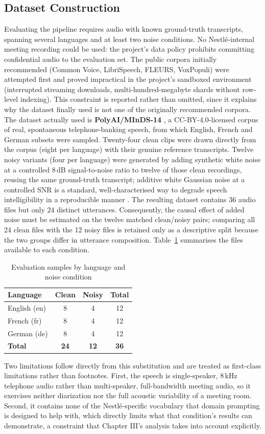 \documentclass[12pt]{report}
\begin{document}
\subsection{Dataset Construction}
Evaluating the pipeline requires audio with known ground-truth transcripts, spanning several languages and at least two noise conditions. No Nestl\'e-internal meeting recording could be used: the project's data policy prohibits committing confidential audio to the evaluation set. The public corpora initially recommended (Common Voice, LibriSpeech, FLEURS, VoxPopuli) were attempted first and proved impractical in the project's sandboxed environment (interrupted streaming downloads, multi-hundred-megabyte shards without row-level indexing). This constraint is reported rather than omitted, since it explains why the dataset finally used is not one of the originally recommended corpora.
The dataset actually used is \textbf{PolyAI/MInDS-14} \cite{gerz2021multilingual}, a CC-BY-4.0-licensed corpus of real, spontaneous telephone-banking speech, from which English, French and German subsets were sampled. Twenty-four clean clips were drawn directly from the corpus (eight per language) with their genuine reference transcripts. Twelve noisy variants (four per language) were generated by adding synthetic white noise at a controlled 8\,dB signal-to-noise ratio to twelve of those clean recordings, reusing the same ground-truth transcript; additive white Gaussian noise at a controlled SNR is a standard, well-characterised way to degrade speech intelligibility in a reproducible manner \cite{graetzer2021intelligibility}. The resulting dataset contains 36 audio files but only 24 distinct utterances. Consequently, the causal effect of added noise must be estimated on the twelve matched clean/noisy pairs; comparing all 24 clean files with the 12 noisy files is retained only as a descriptive split because the two groups differ in utterance composition. Table~\ref{tab:dataset} summarises the files available to each condition.
\begin{table}[H]
\centering
\begin{tabular}{|l|c|c|c|}
\hline
\textbf{Language} & \textbf{Clean} & \textbf{Noisy} & \textbf{Total} \\ \hline
English (en) & 8 & 4 & 12 \\ \hline
French (fr) & 8 & 4 & 12 \\ \hline
German (de) & 8 & 4 & 12 \\ \hline
\textbf{Total} & \textbf{24} & \textbf{12} & \textbf{36} \\ \hline
\end{tabular}
\caption{Evaluation samples by language and noise condition}
\label{tab:dataset}
\end{table}
Two limitations follow directly from this substitution and are treated as first-class limitations rather than footnotes. First, the speech is single-speaker, 8\,kHz telephone audio rather than multi-speaker, full-bandwidth meeting audio, so it exercises neither diarization nor the full acoustic variability of a meeting room. Second, it contains none of the Nestl\'e-specific vocabulary that domain prompting is designed to help with, which directly limits what that condition's results can demonstrate, a constraint that Chapter III's analysis takes into account explicitly.
\end{document}
